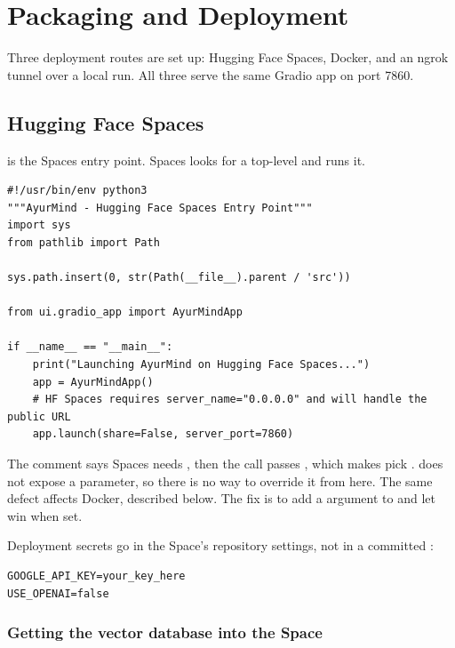 \chapter{Packaging and Deployment}

Three deployment routes are set up: Hugging Face Spaces, Docker, and an ngrok tunnel over a local run. All three serve the same Gradio app on port 7860.

\section{Hugging Face Spaces}

 is the Spaces entry point. Spaces looks for a top-level  and runs it.

\begin{lstlisting}[style=py]
#!/usr/bin/env python3
"""AyurMind - Hugging Face Spaces Entry Point"""
import sys
from pathlib import Path

sys.path.insert(0, str(Path(__file__).parent / 'src'))

from ui.gradio_app import AyurMindApp

if __name__ == "__main__":
    print("Launching AyurMind on Hugging Face Spaces...")
    app = AyurMindApp()
    # HF Spaces requires server_name="0.0.0.0" and will handle the public URL
    app.launch(share=False, server_port=7860)
\end{lstlisting}

\begin{bug}[title={The comment and the code disagree}]
The comment says Spaces needs , then the call passes , which makes  pick .  does not expose a  parameter, so there is no way to override it from here. The same defect affects Docker, described below. The fix is to add a  argument to  and let  win when set.
\end{bug}

Deployment secrets go in the Space's repository settings, not in a committed :

\begin{lstlisting}[style=shell]
GOOGLE_API_KEY=your_key_here
USE_OPENAI=false
\end{lstlisting}

\subsection{Getting the vector database into the Space}

